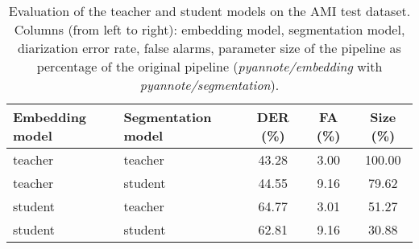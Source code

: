 \begin{table}
\caption{Evaluation of the teacher and student models on the AMI test dataset. Columns (from left to right): embedding model, segmentation model, diarization error rate, false alarms, parameter size of the pipeline as percentage of the original pipeline (\textit{pyannote/embedding} with \textit{pyannote/segmentation}). \newline}
\label{tab:evaluation}{\scriptsize 
\begin{tabular}{llccc}
\toprule
Embedding model & Segmentation model & DER (\%) & FA (\%) & Size (\%) \\
\midrule
teacher & teacher & 43.28 & 3.00 & 100.00 \\
teacher & student & 44.55 & 9.16 & 79.62 \\
student & teacher & 64.77 & 3.01 & 51.27 \\
student & student & 62.81 & 9.16 & 30.88 \\
\bottomrule
\end{tabular}
}\end{table}
